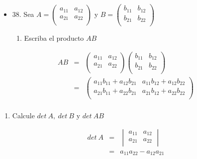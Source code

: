 \documentclass[
]{article}
\begin{document}
\begin{itemize}
\item
  38. Sea \(A = \begin{pmatrix}
  a_{11} & a_{12} \\
  a_{21} & a_{22} \\
  \end{pmatrix}\) y \(B = \begin{pmatrix}
  b_{11} & b_{12} \\
  b_{21} & b_{22} \\
  \end{pmatrix}\)

  \begin{enumerate}
  \def\labelenumi{\alph{enumi}.}
  \item
    Escriba el producto \(AB\)
  \end{enumerate}
\end{itemize}

\[\begin{matrix}
AB & = & \begin{pmatrix}
a_{11} & a_{12} \\
a_{21} & a_{22} \\
\end{pmatrix}\begin{pmatrix}
b_{11} & b_{12} \\
b_{21} & b_{22} \\
\end{pmatrix} \\
 & = & \begin{pmatrix}
a_{11}b_{11} + a_{12}b_{21} & a_{11}b_{12} + a_{12}b_{22} \\
a_{21}b_{11} + a_{22}b_{21} & a_{21}b_{12} + a_{22}b_{22} \\
\end{pmatrix} \\
\end{matrix}\]

\begin{enumerate}
\def\labelenumi{\alph{enumi}.}
\setcounter{enumi}{1}
\item
  Calcule \(det\ A,\ det\ B\) y \(det\ AB\)
\end{enumerate}

\[\begin{matrix}
det\ A & = & \begin{vmatrix}
a_{11} & a_{12} \\
a_{21} & a_{22} \\
\end{vmatrix} \\
 & = & a_{11}a_{22} - a_{12}a_{21} \\
\end{matrix}\]
\end{document}
